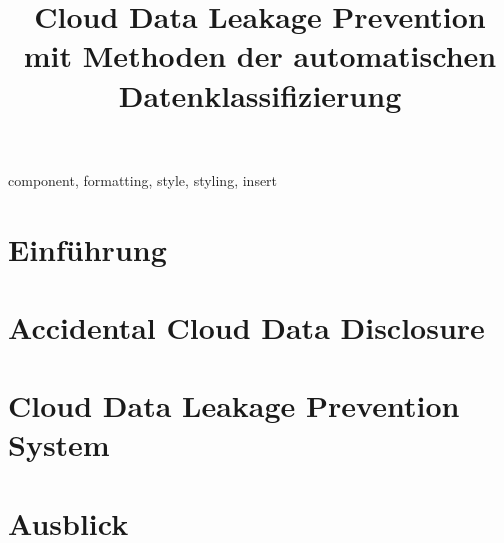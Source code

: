 \documentclass[conference]{IEEEtran}
\begin{document}
\title{Cloud Data Leakage Prevention mit Methoden der automatischen Datenklassifizierung}

\author{
}

\maketitle

\begin{abstract}
    
\end{abstract}

\begin{IEEEkeywords}
    component, formatting, style, styling, insert
\end{IEEEkeywords}

\section{Einführung}


\section{Accidental Cloud Data Disclosure} \label{threat-kapitel}


\section{Cloud Data Leakage Prevention System}


\section{Ausblick}


\balance


\end{document}
